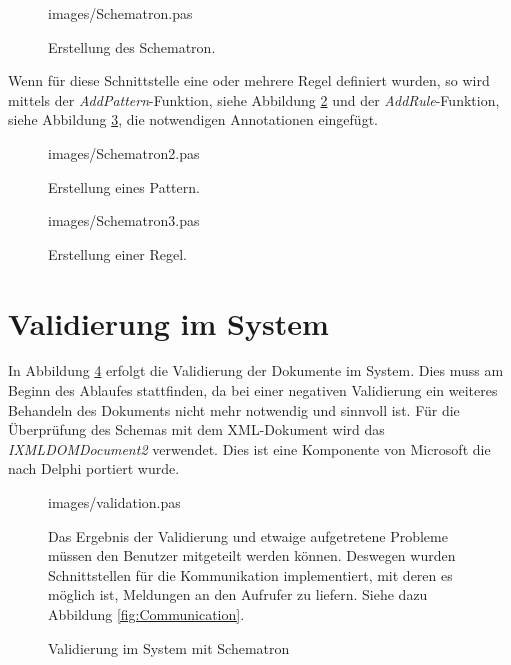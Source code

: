 \begin{figure}
\lstset{language=Pascal, 
        basicstyle=\tiny\ttfamily, 
        numbers=left,
        numberstyle=\tiny, 
        stepnumber=5, 
        firstnumber=0,
        showstringspaces=false
        }
 {images/Schematron.pas}
\caption{Erstellung des Schematron.}
\label{fig:Schematron}
\end{figure}


Wenn für diese Schnittstelle eine oder mehrere Regel definiert wurden, so wird mittels der \emph{AddPattern}-Funktion, siehe Abbildung \ref{fig:Schematron2} und der \emph{AddRule}-Funktion, siehe Abbildung \ref{fig:Schematron3}, die notwendigen Annotationen eingefügt. 

\begin{figure}
\lstset{language=Pascal, 
        basicstyle=\tiny\ttfamily, 
        numbers=left,
        numberstyle=\tiny, 
        stepnumber=5, 
        firstnumber=0,
        showstringspaces=false}
 {images/Schematron2.pas}
\caption{Erstellung eines Pattern.}
\label{fig:Schematron2}
\end{figure}

\begin{figure}
\lstset{language=Pascal, 
        basicstyle=\tiny\ttfamily, 
        numbers=left,
        numberstyle=\tiny, 
        stepnumber=5, 
        firstnumber=0,
        showstringspaces=false}
 {images/Schematron3.pas}
\caption{Erstellung einer Regel.}
\label{fig:Schematron3}
\end{figure}


\section{Validierung im System}
In Abbildung \ref{fig:ValidationExp} erfolgt die Validierung der Dokumente im System. 
Dies muss am Beginn des Ablaufes stattfinden, da bei einer negativen Validierung ein weiteres Behandeln des Dokuments nicht mehr notwendig und sinnvoll ist. 
Für die Überprüfung des Schemas mit dem XML-Dokument wird das \emph{IXMLDOMDocument2} verwendet.
Dies ist eine Komponente von Microsoft die nach Delphi portiert wurde.


\begin{figure}
\lstset{language=Pascal, 
        basicstyle=\tiny\ttfamily, 
        numbers=left,
        numberstyle=\tiny, 
        stepnumber=5, 
        firstnumber=0,
        showstringspaces=false}

    {images/validation.pas}
\caption{Validierung im System mit Schematron%
}
\label{fig:ValidationExp}

Das Ergebnis der Validierung und etwaige aufgetretene Probleme müssen den Benutzer mitgeteilt werden können.
Deswegen wurden Schnittstellen für die Kommunikation implementiert, mit deren es möglich ist, Meldungen an den Aufrufer zu liefern. Siehe dazu Abbildung \ref{fig:Communication}.
\end{figure}

